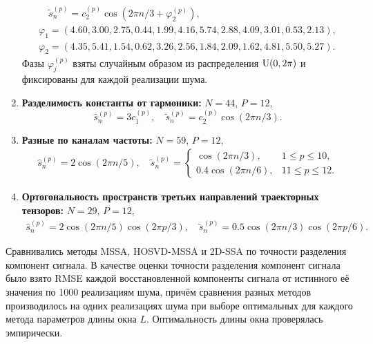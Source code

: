 \documentclass[specialist,
  substylefile=spbu.rtx,
subf,href,colorlinks=true, 12pt]{disser}
\theoremstyle{plain}
\theoremstyle{definition}
\theoremstyle{remark}
\begin{document}
\begin{enumerate}
\begin{gather}
      \quad \tilde{s}_n^{(p)} = c_2^{(p)}\cos(2\pi n /3 + \varphi_2^{(p)}),
      \label{eq:sep-rand-phase}\\
      \varphi_1 = \left(4.60, 3.00, 2.75, 0.44, 1.99, 4.16, 5.74, 2.88, 4.09, 3.01, 0.53, 2.13\right),\nonumber\\
      \varphi_2 = \left(4.35, 5.41, 1.54, 0.62, 3.26, 2.56, 1.84, 2.09, 1.62, 4.81, 5.50, 5.27\right). \nonumber
    \end{gather}
    Фазы $\varphi_j^{(p)}$ взяты случайным образом из распределения $\mathrm{U}(0, 2\pi)$ и фиксированы для
    каждой реализации шума.
  \item \textbf{Разделимость константы от гармоники:} $N = 44$, $P = 12$,
    \begin{equation}
      \hat{s}_n^{(p)} = 3 c_1^{(p)},
      \quad \tilde{s}_n^{(p)} = c_2^{(p)}\cos(2\pi n /3).
      \label{eq:sep-const-cos}
    \end{equation}
  \item \textbf{Разные по каналам частоты:} $N = 59$, $P = 12$,
    \begin{gather}
      \hat{s}_n^{(p)} = 2 \cos(2 \pi n / 5), \quad
      \tilde{s}_n^{(p)} =
      \begin{cases}
        \cos(2\pi n /3), & 1 \leqslant p \leqslant 10,\\
        0.4 \cos(2 \pi n / 6), & 11 \leqslant p \leqslant 12.
      \end{cases}
      \label{eq:sep-periods}
    \end{gather}
  \item \textbf{Ортогональность пространств третьих направлений траекторных тензоров:} $N = 29$, $P = 12$,
    \begin{gather}
      \hat{s}_n^{(p)} = 2 \cos(2 \pi n / 5) \cos(2 \pi p / 3), \quad
      \tilde{s}_n^{(p)} = 0.5 \cos(2\pi n /3) \cos(2 \pi p / 6).
      \label{eq:sep-orthogonal-3}
    \end{gather}
\end{enumerate}

Сравнивались методы MSSA, HOSVD-MSSA и 2D-SSA по точности разделения компонент сигнала.
В качестве оценки точности разделения компонент сигнала было взято RMSE
каждой восстановленной компоненты сигнала от истинного её значения по 1000 реализациям шума,
причём сравнения разных методов производилось на одних реализациях шума при выборе оптимальных
для каждого метода параметров длины окна $L$.
Оптимальность длины окна проверялась эмпирически.
\end{document}
